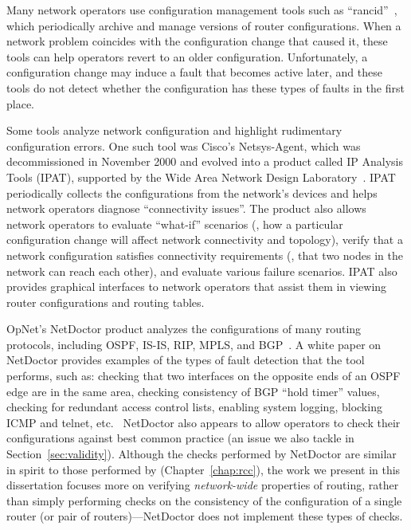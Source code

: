 Many network operators use configuration management tools such as
``rancid''~\cite{www-rancid}, which periodically archive and manage
versions of router
configurations.  When a network problem
coincides with the configuration change that caused it, these tools can
help operators revert to an older configuration.  Unfortunately, a
configuration change may induce a fault
that becomes active later,
and these tools do not detect whether the configuration has these types
of faults in the first place.

Some tools analyze network configuration and highlight
rudimentary configuration errors.  One such tool was Cisco's
Netsys-Agent, which was decommissioned in November 2000 and evolved into
a product called IP Analysis Tools (IPAT), supported by the Wide Area
Network Design Laboratory~\cite{www-wandl-ipat}.  IPAT periodically
collects the configurations from the network's devices and helps
network operators diagnose ``connectivity issues''.  The product also
allows network operators to evaluate ``what-if'' scenarios (\ie, how a
particular configuration change will affect network connectivity and
topology), verify that a network configuration satisfies 
connectivity requirements (\eg, that two nodes in the network can reach
each other), and evaluate various failure scenarios.  IPAT also provides
graphical interfaces to network operators that assist them in viewing
router configurations and routing tables.

OpNet's NetDoctor product analyzes the configurations of many routing
protocols, including OSPF, IS-IS, RIP, MPLS, and
BGP~\cite{www-opnet-netdoctor}.  A white paper on NetDoctor provides
examples of the types of fault detection that the tool performs, such
as: checking that two interfaces on the opposite ends of an OSPF edge
are in the same area, checking consistency of BGP ``hold timer'' values,
checking for redundant access control lists, enabling system logging,
blocking ICMP and telnet, etc.~\cite{www-opnet-netdoctor-wp}
NetDoctor also appears to allow operators to check their
configurations against best common practice (an issue we also tackle in
Section~\ref{sec:validity}).  Although the checks performed by NetDoctor
are similar in spirit to those performed by \rcc
(Chapter~\ref{chap:rcc}), the work we present in this dissertation focuses
more on verifying {\em network-wide} properties of routing, rather than
simply performing checks on the consistency of the configuration of a
single router (or pair of routers)---NetDoctor does not implement these
types of checks.

